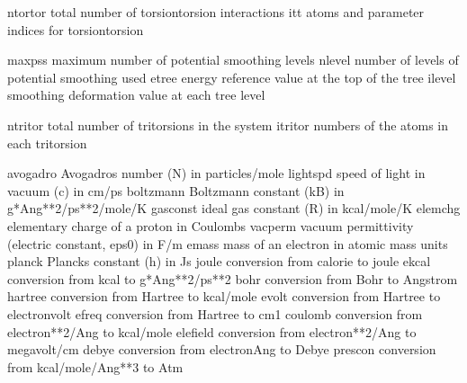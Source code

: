 \documentclass[letterpaper,11pt,english]{sphinxmanual}
\begin{document}
\sphinxAtStartPar
{}

\begin{sphinxVerbatim}[commandchars=\\\{\}]
ntortor         total number of torsion\PYGZhy{}torsion interactions
itt             atoms and parameter indices for torsion\PYGZhy{}torsion
\end{sphinxVerbatim}

\sphinxAtStartPar
{}

\begin{sphinxVerbatim}[commandchars=\\\{\}]
maxpss          maximum number of potential smoothing levels
nlevel          number of levels of potential smoothing used
etree           energy reference value at the top of the tree
ilevel          smoothing deformation value at each tree level
\end{sphinxVerbatim}

\sphinxAtStartPar
{}

\begin{sphinxVerbatim}[commandchars=\\\{\}]
ntritor         total number of tritorsions in the system
itritor         numbers of the atoms in each tritorsion
\end{sphinxVerbatim}

\sphinxAtStartPar
{}

\begin{sphinxVerbatim}[commandchars=\\\{\}]
avogadro        Avogadro\PYGZsq{}s number (N) in particles/mole
lightspd        speed of light in vacuum (c) in cm/ps
boltzmann       Boltzmann constant (kB) in g*Ang**2/ps**2/mole/K
gasconst        ideal gas constant (R) in kcal/mole/K
elemchg         elementary charge of a proton in Coulombs
vacperm         vacuum permittivity (electric constant, eps0) in F/m
emass           mass of an electron in atomic mass units
planck          Planck\PYGZsq{}s constant (h) in J\PYGZhy{}s
joule           conversion from calorie to joule
ekcal           conversion from kcal to g*Ang**2/ps**2
bohr            conversion from Bohr to Angstrom
hartree         conversion from Hartree to kcal/mole
evolt           conversion from Hartree to electron\PYGZhy{}volt
efreq           conversion from Hartree to cm\PYGZhy{}1
coulomb         conversion from electron**2/Ang to kcal/mole
elefield        conversion from electron**2/Ang to megavolt/cm
debye           conversion from electron\PYGZhy{}Ang to Debye
prescon         conversion from kcal/mole/Ang**3 to Atm
\end{sphinxVerbatim}
\end{document}
